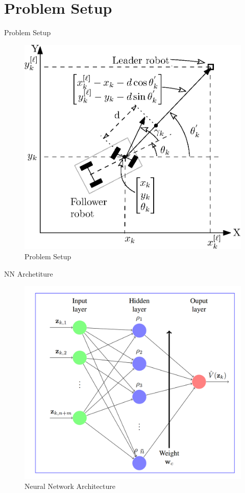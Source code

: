 \documentclass{beamer}
\begin{document}
\section{Problem Setup}
\begin{frame}{Problem Setup}

\begin{figure}
\includegraphics[scale=0.5]{figs/ipe/LF-Setup.eps}
\caption{Problem Setup}
\end{figure}

\end{frame}

\begin{frame}{NN Archetiture}
\begin{figure}
\includegraphics[scale=0.15]{figs/img/criticNeuralNetwork.png}
\caption{Neural Network Architecture}
\end{figure}
\end{frame}
\end{document}
